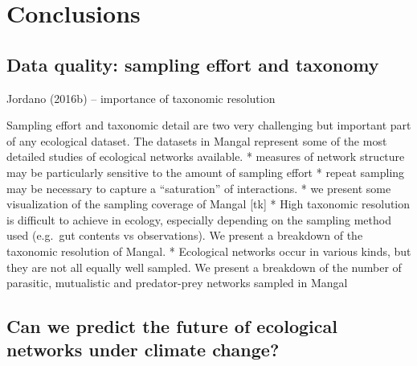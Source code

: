 \hypertarget{conclusions}{%
\section{Conclusions}\label{conclusions}}

\hypertarget{data-quality-sampling-effort-and-taxonomy}{%
\subsection{Data quality: sampling effort and
taxonomy}\label{data-quality-sampling-effort-and-taxonomy}}

Jordano (2016b) -- importance of taxonomic resolution

Sampling effort and taxonomic detail are two very challenging but
important part of any ecological dataset. The datasets in Mangal
represent some of the most detailed studies of ecological networks
available. * measures of network structure may be particularly sensitive
to the amount of sampling effort * repeat sampling may be necessary to
capture a ``saturation'' of interactions. * we present some
visualization of the sampling coverage of Mangal {[}tk{]} * High
taxonomic resolution is difficult to achieve in ecology, especially
depending on the sampling method used (e.g.~gut contents vs
observations). We present a breakdown of the taxonomic resolution of
Mangal. * Ecological networks occur in various kinds, but they are not
all equally well sampled. We present a breakdown of the number of
parasitic, mutualistic and predator-prey networks sampled in Mangal

\hypertarget{can-we-predict-the-future-of-ecological-networks-under-climate-change}{%
\subsection{Can we predict the future of ecological networks under
climate
change?}\label{can-we-predict-the-future-of-ecological-networks-under-climate-change}}

